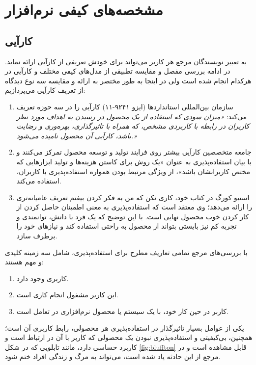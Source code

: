  \section{مشخصه‌های کیفی نرم‌افزار}
 \subsection{کارآیی}
 به تعبیر نویسندگان مرجع
 \cite{albert_measuring_2013}
هر کاربر می‌تواند برای خودش تعریفی از کارآیی ارائه نماید. در ادامه بررسی مفصل و مقایسه تطبیقی از مدل‌های کیفی مختلف و کارآیی در هرکدام انجام شده است ولی در اینجا به طور مختصر به ارائه و مقایسه سه نوع دیدگاه از تعریف کارآیی می‌پردازیم:
\begin{enumerate}
	\item 
	سازمان بین‌المللی استانداردها (ایزو ۹۲۴۱-۱۱) کارآیی را در سه حوزه تعریف می‌کند:
	\emph{«میزان سودی که استفاده از یک محصول در رسیدن به اهداف مورد نظر کاربران در رابطه با کاربردی مشخص، که همراه با تاثیرگذاری، بهره‌وری و رضایت باشد، کارآیی آن محصول نامیده می‌شود.»}
	\item
	جامعه متخصصین کارآیی
	بیشتر روی فرایند تولید و توسعه محصول تمرکز می‌کنند و با بیان استفاده‌پذیری به عنوان «یک روش برای کاستن هزینه‌ها و تولید ابزارهایی که مختص کاربرانشان باشد»، از ویژگی مرتبط بودن همواره استفاده‌پذیری با کاربران، استفاده می‌کند.
	\item 
	استیو کورگ در کتاب خود، کاری نکن که من به فکر کردن بیفتم  تعریف عامیانه‌تری را ارائه می‌دهد؛ وی معتقد است که استفاده‌پذیری به معنی اطمینان حاصل کردن از کار کردن خوب محصول نهایی است. با این توضیح که یک فرد با دانش، توانمندی و تجربه کم نیز بایستی بتواند از محصول به راحتی استفاده کند و نیازهای خود را برطرف سازد.
\end{enumerate}
 با بررسی‌های مرجع
 \cite{albert_measuring_2013}
 تمامی تعاریف مطرح برای استفاده‌پذیری، شامل سه زمینه کلیدی و مهم هستند:
 \begin{enumerate}
 	\item 
 	کاربری وجود دارد.
 	\item 
 	این کاربر مشغول انجام کاری است.
 	\item 
 	کاربر در حین کار خود، با یک سیستم یا محصول نرم‌افزاری در تعامل است.
 \end{enumerate}
 یکی از عوامل بسیار تاثیرگذار در استفاده‌پذیری هر محصولی، رابط کاربری آن است؛ همچنین، بی‌کیفیتی و استفاده‌پذیری نبودن یک محصولی که کاربر با آن در ارتباط است و کاربرد حساسی دارد، مانند تابلویی که در شکل
\ref{fig:bluffton}
قابل مشاهده است و در مرجع 
\cite{albert_measuring_2013}
از این حادثه یاد شده است، می‌تواند به مرگ و زندگی افراد ختم شود.
